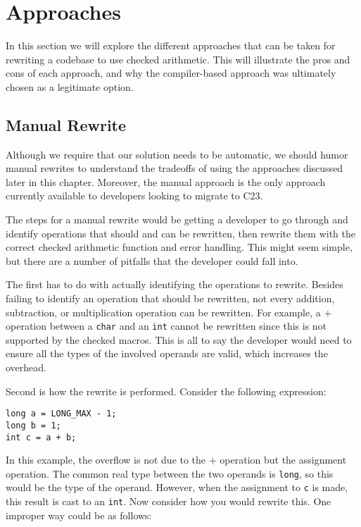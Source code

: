 \section{Approaches}

In this section we will explore the different approaches that can be taken for rewriting a codebase to use checked arithmetic. This will illustrate the pros and cons of each approach, and why the compiler-based approach was ultimately chosen as a legitimate option.

\subsection{Manual Rewrite}

Although we require that our solution needs to be automatic, we should humor manual rewrites to understand the tradeoffs of using the approaches discussed later in this chapter. Moreover, the manual approach is the only approach currently available to developers looking to migrate to C23.

The steps for a manual rewrite would be getting a developer to go through and identify operations that should and can be rewritten, then rewrite them with the correct checked arithmetic function and error handling. This might seem simple, but there are a number of pitfalls that the developer could fall into.

The first has to do with actually identifying the operations to rewrite. Besides failing to identify an operation that should be rewritten, not every addition, subtraction, or multiplication operation can be rewritten. For example, a $+$ operation between a \texttt{char} and an \texttt{int} cannot be rewritten since this is not supported by the checked macros. This is all to say the developer would need to ensure all the types of the involved operands are valid, which increases the overhead.

Second is how the rewrite is performed. Consider the following expression:
\begin{flushleft}
\begin{minipage}{\linewidth}
\texttt{long a = LONG\_MAX - 1;\\
long b = 1;\\
int c = a + b;\\
}
\end{minipage}
\end{flushleft}

In this example, the overflow is not due to the $+$ operation but the assignment operation. The common real type between the two operands is \texttt{long}, so this would be the type of the operand. However, when the assignment to \texttt{c} is made, this result is cast to an \texttt{int}. Now consider how you would rewrite this. One improper way could be as follows:

